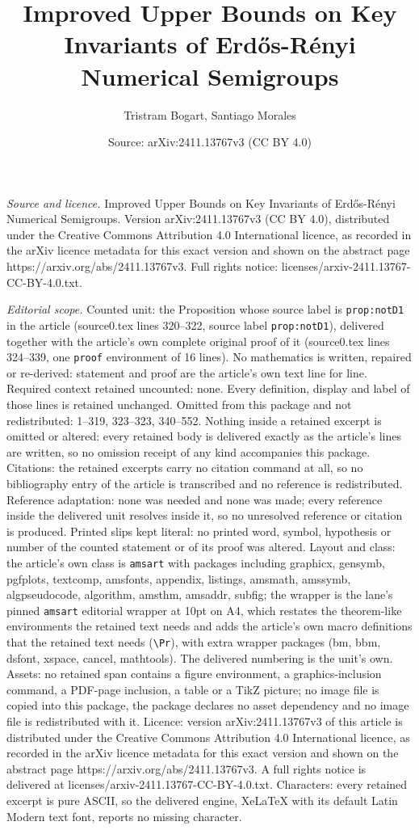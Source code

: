 \documentclass[10pt,a4paper]{amsart}
\title[Improved Upper Bounds on Key Invariants of Erd\H{o}s-R\'enyi]{Improved Upper Bounds on Key Invariants of Erd\H{o}s-R\'enyi Numerical Semigroups}
\author{Tristram Bogart, Santiago Morales}
\date{Source: arXiv:2411.13767v3 (CC BY 4.0)}
\begin{document}
\maketitle

\noindent\emph{Source and licence.} Improved Upper Bounds on Key Invariants of Erd\H{o}s-R\'enyi Numerical Semigroups. Version arXiv:2411.13767v3 (CC BY 4.0), distributed under the Creative Commons Attribution 4.0 International licence, as recorded in the arXiv licence metadata for this exact version and shown on the abstract page https://arxiv.org/abs/2411.13767v3. Full rights notice: licenses/arxiv-2411.13767-CC-BY-4.0.txt.\par\smallskip

\noindent\textit{Editorial scope.} Counted unit: the Proposition whose source label is \texttt{prop:notD1} in the article (source0.tex lines 320--322, source label \texttt{prop:notD1}), delivered together with the article's own complete original proof of it (source0.tex lines 324--339, one \texttt{proof} environment of 16 lines). No mathematics is written, repaired or re-derived: statement and proof are the article's own text line for line. Required context retained uncounted: none. Every definition, display and label of those lines is retained unchanged. Omitted from this package and not redistributed: 1--319, 323--323, 340--552. Nothing inside a retained excerpt is omitted or altered: every retained body is delivered exactly as the article's lines are written, so no omission receipt of any kind accompanies this package. Citations: the retained excerpts carry no citation command at all, so no bibliography entry of the article is transcribed and no reference is redistributed. Reference adaptation: none was needed and none was made; every reference inside the delivered unit resolves inside it, so no unresolved reference or citation is produced. Printed slips kept literal: no printed word, symbol, hypothesis or number of the counted statement or of its proof was altered. Layout and class: the article's own class is \texttt{amsart} with packages including graphicx, gensymb, pgfplots, textcomp, amsfonts, appendix, listings, amsmath, amssymb, algpseudocode, algorithm, amsthm, amsaddr, subfig; the wrapper is the lane's pinned \texttt{amsart} editorial wrapper at 10pt on A4, which restates the theorem-like environments the retained text needs and adds the article's own macro definitions that the retained text needs (\texttt{\textbackslash Pr}), with extra wrapper packages (bm, bbm, dsfont, xspace, cancel, mathtools). The delivered numbering is the unit's own. Assets: no retained span contains a figure environment, a graphics-inclusion command, a PDF-page inclusion, a table or a TikZ picture; no image file is copied into this package, the package declares no asset dependency and no image file is redistributed with it. Licence: version arXiv:2411.13767v3 of this article is distributed under the Creative Commons Attribution 4.0 International licence, as recorded in the arXiv licence metadata for this exact version and shown on the abstract page https://arxiv.org/abs/2411.13767v3. A full rights notice is delivered at licenses/arxiv-2411.13767-CC-BY-4.0.txt. Characters: every retained excerpt is pure ASCII, so the delivered engine, XeLaTeX with its default Latin Modern text font, reports no missing character.
\end{document}
